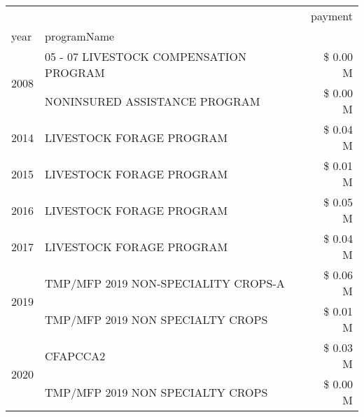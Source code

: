 \begin{tabular}{llr}
\toprule
 &  & payment \\
year & programName &  \\
\midrule
\multirow[t]{2}{*}{2008} & 05 - 07 LIVESTOCK COMPENSATION PROGRAM & \$ 0.00 M \\
 & NONINSURED ASSISTANCE PROGRAM & \$ 0.00 M \\
\cline{1-3}
2014 & LIVESTOCK FORAGE PROGRAM & \$ 0.04 M \\
\cline{1-3}
2015 & LIVESTOCK FORAGE PROGRAM & \$ 0.01 M \\
\cline{1-3}
2016 & LIVESTOCK FORAGE PROGRAM & \$ 0.05 M \\
\cline{1-3}
2017 & LIVESTOCK FORAGE PROGRAM & \$ 0.04 M \\
\cline{1-3}
\multirow[t]{2}{*}{2019} & TMP/MFP 2019 NON-SPECIALITY CROPS-A & \$ 0.06 M \\
 & TMP/MFP 2019 NON SPECIALTY CROPS & \$ 0.01 M \\
\cline{1-3}
\multirow[t]{2}{*}{2020} & CFAPCCA2 & \$ 0.03 M \\
 & TMP/MFP 2019 NON SPECIALTY CROPS & \$ 0.00 M \\
\cline{1-3}
\bottomrule
\end{tabular}

